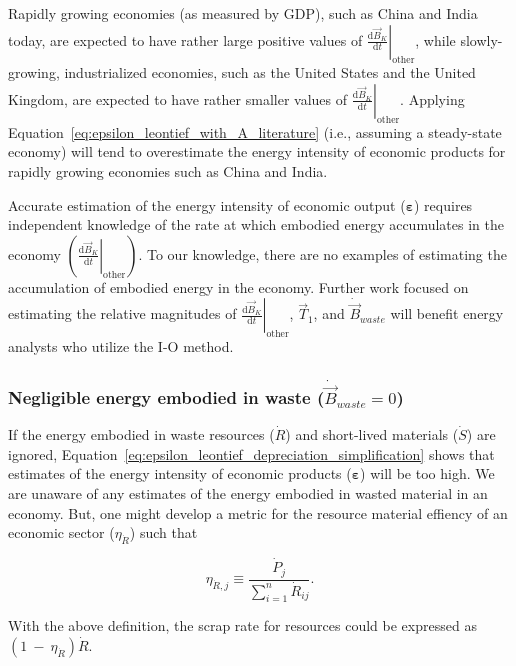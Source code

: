 Rapidly growing economies (as measured by GDP), such as China and India today,
are expected to have rather large positive values of 
$\left. \frac{\mathrm{d}\vec{B}_{K}}{\mathrm{d}t} \right|_{\mathrm{other}}$,
while slowly-growing, industrialized economies, 
such as the United States and the United Kingdom,
are expected to have rather smaller values of 
$\left. \frac{\mathrm{d}\vec{B}_{K}}{\mathrm{d}t} \right|_{\mathrm{other}}$.
Applying Equation~\ref{eq:epsilon_leontief_with_A_literature} 
(i.e., assuming a steady-state economy)
will tend to overestimate the energy intensity 
of economic products for rapidly growing economies such as China and India.

Accurate estimation of the energy intensity of economic output ($\bm{\varepsilon}$)
requires independent knowledge of the rate 
at which embodied energy accumulates in the economy 
$\left( \left. \frac{\mathrm{d}\vec{B}_{K}}{\mathrm{d}t} \right|_{\mathrm{other}} \right)$. 
To our knowledge, there are no examples of estimating the accumulation 
of embodied energy in the economy. 
Further work focused on estimating the relative magnitudes of 
$\left. \frac{\mathrm{d}\vec{B}_{K}}{\mathrm{d}t} \right|_{\mathrm{other}}$,
$\vec{T}_{1}$, and $\dot{\vec{B}}_{waste}$ 
will benefit energy analysts who utilize the I-O method.


\subsubsection{Negligible energy embodied in waste ($\dot{\vec{B}}_{waste} = 0$)}

If the energy embodied in waste resources ($\dot{R}$)
and short-lived materials ($\dot{S}$) are ignored,
Equation~\ref{eq:epsilon_leontief_depreciation_simplification}
shows that estimates of the energy intensity of economic products 
($\bm{\varepsilon}$) will be too high.
We are unaware of any estimates of the energy embodied in wasted
material in an economy.  
But, one might develop a metric for the resource material effiency of an 
economic sector ($\eta_{\dot{R}}$) 
such that

\begin{equation}
	\eta_{\dot{R},j}
	\equiv \frac{\dot{P}_{j}}{\sum\limits_{i=1}^{n} \dot{R}_{ij}}.
\end{equation}

\noindent{}With the above definition, 
the scrap rate for resources could be expressed as
$(1~-~\eta_{\dot{R}}) \dot{R}$.

